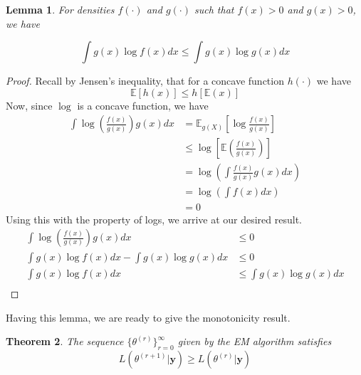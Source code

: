 \documentclass{article}
\newcommand{\E}{{\mathbb{E}}}
\newtheorem{theorem}{Theorem}
\newtheorem{lemma}[theorem]{Lemma}
\begin{document}
\begin{lemma}
For densities $f(\cdot)$ and $g(\cdot)$ such that $f(x)>0$ and $g(x)>0$, we have

$$\int g(x)\log f(x) dx \leq \int g(x)\log g(x)dx$$
\end{lemma}
\begin{proof}
Recall by Jensen's inequality, that for a concave function $h(\cdot)$ we have $$\E[h(x)]\leq h[\E(x)]$$ Now, since $\log$ is a concave function, we have 
\begin{align*}
\int\log\left(\frac{f(x)}{g(x)}\right)g(x)dx 
&= \E_{g(X)}\left[\log\frac{f(x)}{g(x)}\right]\\
&\leq \log\left[\E\left(\frac{f(x)}{g(x)}\right)\right]\\ 
&= \log\left(\int \frac{f(x)}{g(x)}g(x)dx\right)\\
&=\log\left(\int f(x)dx\right)\\
&= 0
\end{align*}
Using this with the property of logs, we arrive at our desired result. 
\begin{align*}
\int\log\left(\frac{f(x)}{g(x)}\right)g(x)dx &\leq 0\\
\int g(x)\log f(x) dx - \int g(x)\log g(x)dx &\leq 0\\
\int g(x)\log f(x) dx &\leq \int g(x)\log g(x)dx \\
\end{align*}
\end{proof}
Having this lemma, we are ready to give the monotonicity result. 
\begin{theorem}
The sequence $\{\theta^{(r)}\}_{r=0}^{\infty}$ given by the EM algorithm satisfies $$L(\theta^{(r+1)}|\mathbf{y})\geq L(\theta^{(r)}|\mathbf{y})$$
\end{theorem}
\end{document}
